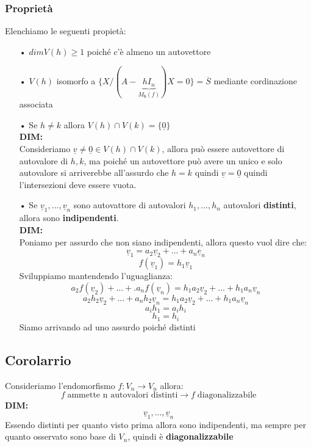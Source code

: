 \subsubsection{Proprietà}
Elenchiamo le seguenti propietà:
\begin{itemize}
\item[•] $dim V(h) \ge 1 $ poiché c'è almeno un autovettore
\item[•] $V(h)$ isomorfo a $\{X/(A-\underbrace{hI_n}_{M_{\mathtt{R}}(f)})X=0 \} = \overline{S} $ mediante cordinazione associata
\item[•] Se $h \neq k$ allora $V(h) \cap V(k) = \{\underline{0}\}$\\
\textbf{DIM:}\\
Consideriamo $\underline{v} \neq \underline{0} \in  V(h) \cap V(k)$, allora può essere autovettore di autovalore di $h,k$, ma poiché un autovettore può avere un unico e solo autovalore si arriverebbe all’assurdo che $h = k$ quindi $\underline{v} = \underline{0}$ quindi l'intersezioni deve essere vuota.
\item[•] Se $\underline{v}_1,...,\underline{v}_n$ sono autovattore di autovalori $h_1,...,h_n$ autovalori \textbf{distinti}, allora sono \textbf{indipendenti}.\\
\textbf{DIM:}\\
Poniamo per assurdo che non siano indipendenti, allora questo vuol dire che:
$$ \underline{v}_1 = a_2\underline{v}_2+...+a_n\underline{e}_n $$
$$ f(\underline{v}_1) = h_1\underline{v}_1 $$
Sviluppiamo mantendendo l'uguaglianza:
$$ a_2f(\underline{v}_2)+...+.a_nf(\underline{v}_n) = h_1a_2\underline{v}_2+...+h_1a_n\underline{v}_n $$
$$ a_2h_2\underline{v}_2+...+a_nh_2\underline{v}_n = h_1a_2\underline{v}_2+...+h_1a_n\underline{v}_n $$
$$ a_ih_1 = a_ih_i $$ 
$$ h_1 = h_i$$
Siamo arrivando ad uno assurdo poiché distinti

\end{itemize}

\subsection{Corolarrio}
Consideriamo l'endomorfismo $f: V_n \rightarrow V_n$ allora:
$$ f \; \text{ammette n autovalori distinti} \rightarrow f \; \text{diagonalizzabile}  $$
\textbf{DIM:}\\
$$ \underline{v}_1,...,\underline{v}_n $$
Essendo distinti per quanto visto prima allora sono indipendenti, ma sempre per quanto osservato sono base di $V_n$, quindi è \textbf{diagonalizzabile}\\

